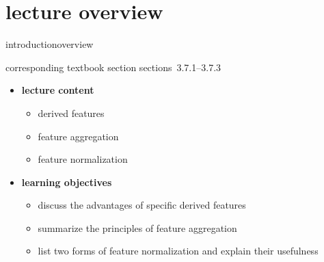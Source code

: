 

\subtitle{module 3.7.1: feature post-processing}


	

    \section[overview]{lecture overview}
        \begin{frame}{introduction}{overview}
            \begin{block}{corresponding textbook section}
                    sections~3.7.1--3.7.3
            \end{block}

            \begin{itemize}
                \item   \textbf{lecture content}
                    \begin{itemize}
                        \item       derived features
                        \item       feature aggregation
                        \item       feature normalization
                    \end{itemize}
                \bigskip
                \item<2->   \textbf{learning objectives}
                    \begin{itemize}
                        \item       discuss the advantages of specific derived features
                        \item       summarize the principles of feature aggregation
                        \item       list two forms of feature normalization and explain their usefulness
                    \end{itemize}
            \end{itemize}
        \end{frame}

